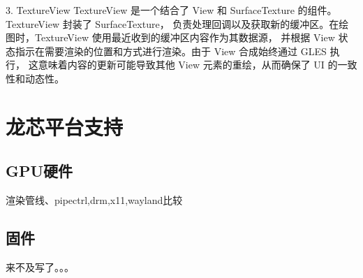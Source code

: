 3. TextureView
TextureView 是一个结合了 View 和 SurfaceTexture 的组件。TextureView 封装了 SurfaceTexture，
负责处理回调以及获取新的缓冲区。在绘图时，TextureView 使用最近收到的缓冲区内容作为其数据源，
并根据 View 状态指示在需要渲染的位置和方式进行渲染。由于 View 合成始终通过 GLES 执行，
这意味着内容的更新可能导致其他 View 元素的重绘，从而确保了 UI 的一致性和动态性。


\section{龙芯平台支持}
\subsection{GPU硬件}
渲染管线、pipectrl,drm,x11,wayland比较
\subsection{固件}
来不及写了。。。
